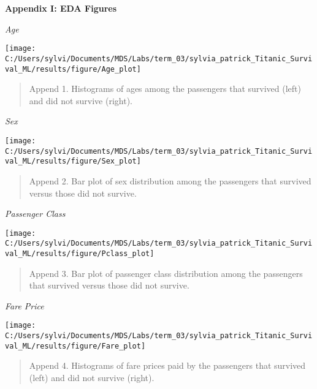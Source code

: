 \documentclass[]{article}
\begin{document}
\textbf{Appendix I: EDA Figures}

\emph{Age}

\begin{center}\texttt{[image: C:/Users/sylvi/Documents/MDS/Labs/term\_03/sylvia\_patrick\_Titanic\_Survival\_ML/results/figure/Age\_plot]} \end{center}

\begin{quote}
Append 1. Histograms of ages among the passengers that survived (left)
and did not survive (right).
\end{quote}

\newpage

\emph{Sex}

\begin{center}\texttt{[image: C:/Users/sylvi/Documents/MDS/Labs/term\_03/sylvia\_patrick\_Titanic\_Survival\_ML/results/figure/Sex\_plot]} \end{center}

\begin{quote}
Append 2. Bar plot of sex distribution among the passengers that
survived versus those did not survive.
\end{quote}

\newpage

\emph{Passenger Class}

\begin{center}\texttt{[image: C:/Users/sylvi/Documents/MDS/Labs/term\_03/sylvia\_patrick\_Titanic\_Survival\_ML/results/figure/Pclass\_plot]} \end{center}

\begin{quote}
Append 3. Bar plot of passenger class distribution among the passengers
that survived versus those did not survive.
\end{quote}

\newpage

\emph{Fare Price}

\begin{center}\texttt{[image: C:/Users/sylvi/Documents/MDS/Labs/term\_03/sylvia\_patrick\_Titanic\_Survival\_ML/results/figure/Fare\_plot]} \end{center}

\begin{quote}
Append 4. Histograms of fare prices paid by the passengers that survived
(left) and did not survive (right).
\end{quote}

\newpage
\end{document}
